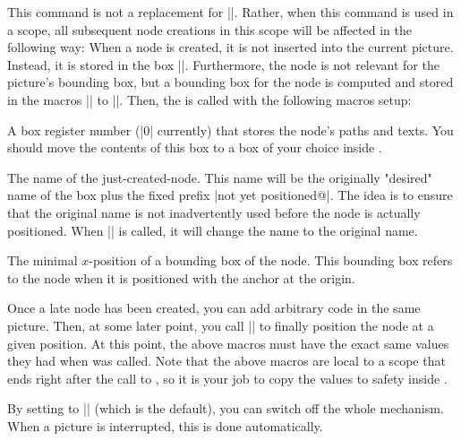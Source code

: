 \begin{command}{\pgfpositionnodelater{}}
  This command is not a replacement for |\pgfnode|. Rather, when this
  command is used in a scope, all subsequent node creations in this
  scope will be affected in the following way:  When a node is
  created, it is not inserted into the current picture. Instead, it
  is stored in the box |\pgfpositionnodelaterbox|. Furthermore, the
  node is not relevant for the picture's bounding box, but a bounding
  box for the node is computed and stored in the macros
  |\pgfpositionnodelaterminx| to |\pgfpositionnodelatermaxy|. Then,
  the  is called with the following macros setup:
  
  \begin{command}{\pgfpositionnodelaterbox}
    A box register number (|0| currently) that stores the node's paths
    and texts. You should move the contents of this box to a box of
    your choice inside .
  \end{command}

  \begin{command}{\pgfpositionnodelatername}
    The name of the just-created-node. This name will be the
    originally "desired" name of the box plus the fixed prefix
    |not yet positioned@|. The idea is to ensure that the original
    name is not inadvertently used before the node is actually
    positioned. When |\pgfpositionnodenow| is called, it will change
    the name to the original name.
  \end{command}
  
  \begin{command}{\pgfpositionnodelaterminx}
    The minimal $x$-position of a bounding box of the node. This
    bounding box refers to the node when it is positioned with the
    anchor at the origin.
  \end{command}
  \begin{command}{\pgfpositionnodelaterminy}
  \end{command}
  \begin{command}{\pgfpositionnodelatermaxx}
  \end{command}
  \begin{command}{\pgfpositionnodelatermaxy}
  \end{command}
  
  Once a late node has been created, you can add arbitrary code in the  
  same picture. Then, at some later point, you call
  |\pgfpositionnodenow| to finally position the node at a given
  position.  At this point, the above macros must have the exact same
  values they had when  was called. Note that the
  above macros are local to a scope that ends right after the call to
  , so it is your job to copy the values to safety
  inside .
  
  By setting  to |\relax| (which is the default), you
  can switch off the whole mechanism. When a picture is interrupted,
  this is done automatically.
\end{command}



